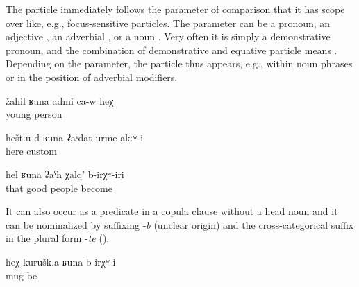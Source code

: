 The particle   immediately follows the parameter of comparison that it has scope over like, e.g., focus-sensitive particles. The parameter can be a pronoun, an adjective , an adverbial , or a noun . Very often it is simply a demonstrative pronoun, and the combination of demonstrative and equative particle means  . Depending on the parameter, the particle thus appears, e.g., within noun phrases  or in the position of adverbial modifiers.
%
\begin{exe}
	\ex	\label{ex:He is like a young man}
	\gll	žahil	ʁuna	admi	ca-w	heχ\\
		young		person		\\
	\glt	{}

	\ex	\label{ex:There were not such customs as here}
	\gll	heštːu-d	ʁuna	ʡaˁdat-urme	akːʷ-i\\
		here		custom	\\
	\glt	{}

	\ex	\label{ex:They were so good people}
	\gll	hel	ʁuna	ʡaˁħ	χalq'	b-irχʷ-iri\\
		that		good	people	become\\
	\glt	{}
\end{exe}

It can also occur as a predicate in a copula clause without a head noun and it can be nominalized by suffixing -\textit{b} (unclear origin) and the cross-categorical suffix in the plural form -\textit{te} ().
%
\begin{exe}
	\ex	\label{ex:This was like a mug}
	\gll	heχ	kuruškːa	ʁuna	b-irχʷ-i\\
			mug 	be\\
	\glt	{}
\end{exe}

